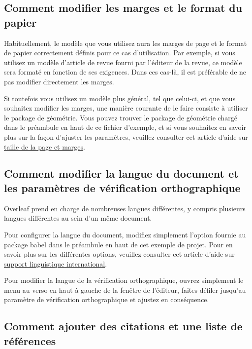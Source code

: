 \documentclass{article}
\begin{document}
\subsection{Comment modifier les marges et le format du papier}

Habituellement, le modèle que vous utilisez aura les marges de page et le format de papier correctement définis pour ce cas d'utilisation. Par exemple, si vous utilisez un modèle d'article de revue fourni par l'éditeur de la revue, ce modèle sera formaté en fonction de ses exigences. Dans ces cas-là, il est préférable de ne pas modifier directement les marges.


Si toutefois vous utilisez un modèle plus général, tel que celui-ci, et que vous souhaitez modifier les marges, une manière courante de le faire consiste à utiliser le package de géométrie. Vous pouvez trouver le package de géométrie chargé dans le préambule en haut de ce fichier d'exemple, et si vous souhaitez en savoir plus sur la façon d'ajuster les paramètres, veuillez consulter cet article d'aide sur \href{https://www.overleaf .com/learn/latex/page_size_and_margins}{taille de la page et marges}.

\subsection{Comment modifier la langue du document et les paramètres de vérification orthographique}

Overleaf prend en charge de nombreuses langues différentes, y compris plusieurs langues différentes au sein d'un même document.

Pour configurer la langue du document, modifiez simplement l'option fournie au package babel dans le préambule en haut de cet exemple de projet. Pour en savoir plus sur les différentes options, veuillez consulter cet article d'aide sur \href{https://www.overleaf.com/learn/latex/International_lingual_support}{support linguistique international}.

Pour modifier la langue de la vérification orthographique, ouvrez simplement le menu au verso en haut à gauche de la fenêtre de l'éditeur, faites défiler jusqu'au paramètre de vérification orthographique et ajustez en conséquence.

\subsection{Comment ajouter des citations et une liste de références}
\end{document}
